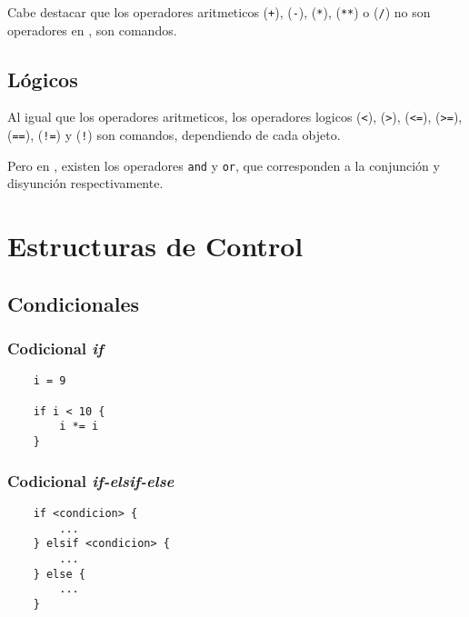\documentclass[12pt,letterpaper,titlepage,oneside,openright]{book}
\newcommand{\OhTeX}{%
    \makebox[0.76em][c]{O}%
    \makebox[0.25em][c]{%
        \raisebox{0.14em}[0em][0em]{%
            \fontsize{0.5em}{0cm}%
                \selectfont H%
        }%
    }%
    \makebox[1.35em][c]{\TeX}%
}
\newcommand{\ohtex}{\OhTeX\xspace}
\begin{document}
Cabe destacar que los operadores aritmeticos (\texttt{+}), (\texttt{-}), (\texttt{*}), (\texttt{**}) o (\texttt{/}) no son operadores en \ohtex, son comandos.

\subsection{Lógicos}

Al igual que los operadores aritmeticos, los operadores logicos (\texttt{<}), (\texttt{>}), (\texttt{<=}), (\texttt{>=}), (\texttt{==}), (\texttt{!=}) y (\texttt{!}) son comandos, dependiendo de cada objeto.

Pero en \ohtex, existen los operadores \texttt{and} y \texttt{or}, que corresponden a la conjunción y disyunción respectivamente.

\section{Estructuras de Control}

\subsection{Condicionales}

\subsubsection{Codicional \textit{if}}

\begin{center}
\begin{minipage}{\linewidth}
\begin{lstlisting}
    i = 9

    if i < 10 {
        i *= i
    }
\end{lstlisting}
\end{minipage}
\end{center}

\subsubsection{Codicional \textit{if-elsif-else}}

\begin{center}
\begin{minipage}{\linewidth}
\begin{lstlisting}
    if <condicion> {
        ...
    } elsif <condicion> {
        ...
    } else {
        ...
    }
\end{lstlisting}
\end{minipage}
\end{center}
\end{document}
